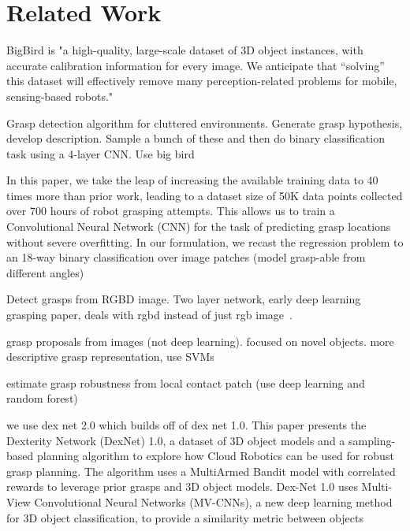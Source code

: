 
\section{Related Work}
\label{sec:related_work}


BigBird is "a high-quality, large-scale dataset of 3D object instances, with accurate calibration information for every image. We anticipate that “solving” this dataset will effectively remove many perception-related problems for mobile, sensing-based robots."~\cite{singh2014bigbird} 

Grasp detection algorithm for cluttered environments. Generate grasp hypothesis, develop description. Sample a bunch of these and then do binary classification task using a 4-layer CNN. Use big bird~\cite{pas2017grasp}

In this paper, we take the leap of increasing the available training data to 40 times more than prior work, leading to a dataset size of 50K data points collected over 700 hours of robot grasping attempts. This allows us to train a Convolutional Neural Network (CNN) for the task of predicting grasp locations without severe overfitting. In our formulation, we recast the regression problem to an 18-way binary classification over image patches (model grasp-able from different angles)~\cite{pinto2016supersizing}

Detect grasps from RGBD image. Two layer network, early deep learning grasping paper, deals with rgbd instead of just rgb image~\cite{lenz2015deep}. 

grasp proposals from images (not deep learning). focused on novel objects. more descriptive grasp representation, use SVMs \cite{jiang2011efficient}

estimate grasp robustness from local contact patch (use deep learning and random forest)~\cite{seita2016large}

we use dex net 2.0 which builds off of dex net 1.0. This paper presents the Dexterity Network (DexNet) 1.0, a dataset of 3D object models and a sampling-based planning algorithm to explore how Cloud Robotics can be used for robust grasp planning. The algorithm uses a MultiArmed Bandit model with correlated rewards to leverage prior grasps and 3D object models. Dex-Net 1.0 uses Multi-View Convolutional Neural Networks (MV-CNNs), a new deep learning method for 3D object classification, to provide a similarity metric between objects~\cite{mahler2016dex}


